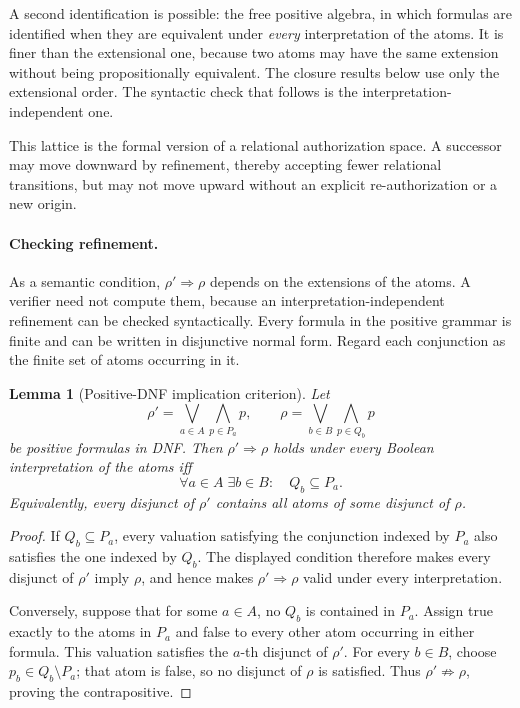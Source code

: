 \documentclass[10pt,twocolumn]{article}
\newtheorem{lemma}{Lemma}
\begin{document}
A second identification is possible: the free positive algebra, in which
formulas are identified when they are equivalent under \emph{every}
interpretation of the atoms. It is finer than the extensional one, because two
atoms may have the same extension without being propositionally equivalent. The
closure results below use only the extensional order. The syntactic check that
follows is the interpretation-independent one.

This lattice is the formal version of a relational authorization space. A
successor may move downward by refinement, thereby accepting fewer relational
transitions, but may not move upward without an explicit re-authorization or a
new origin.

\paragraph{Checking refinement.}\label{sec:refinement}
As a semantic condition, \(\rho'\Rightarrow\rho\) depends on the extensions of
the atoms. A verifier need not compute them, because an
interpretation-independent refinement can be checked syntactically. Every
formula in the positive grammar is finite and can be written in disjunctive
normal form. Regard each conjunction as the finite set of atoms occurring in
it.

\begin{lemma}[Positive-DNF implication criterion]\label{lem:dnf}
Let
\[
\rho'=\bigvee_{a\in A}\bigwedge_{p\in P_a}p,
\qquad
\rho=\bigvee_{b\in B}\bigwedge_{p\in Q_b}p
\]
be positive formulas in DNF. Then \(\rho'\Rightarrow\rho\) holds under every
Boolean interpretation of the atoms iff
\[
\forall a\in A\;\exists b\in B:\quad Q_b\subseteq P_a.
\]
Equivalently, every disjunct of \(\rho'\) contains all atoms of some disjunct
of \(\rho\).
\end{lemma}

\begin{proof}
If \(Q_b\subseteq P_a\), every valuation satisfying the conjunction indexed by
\(P_a\) also satisfies the one indexed by \(Q_b\). The displayed condition
therefore makes every disjunct of \(\rho'\) imply \(\rho\), and hence makes
\(\rho'\Rightarrow\rho\) valid under every interpretation.

Conversely, suppose that for some \(a\in A\), no \(Q_b\) is contained in
\(P_a\). Assign true exactly to the atoms in \(P_a\) and false to every other
atom occurring in either formula. This valuation satisfies the \(a\)-th
disjunct of \(\rho'\). For every \(b\in B\), choose
\(p_b\in Q_b\setminus P_a\); that atom is false, so no disjunct of \(\rho\) is
satisfied. Thus \(\rho'\not\Rightarrow\rho\), proving the contrapositive.
\end{proof}
\end{document}
